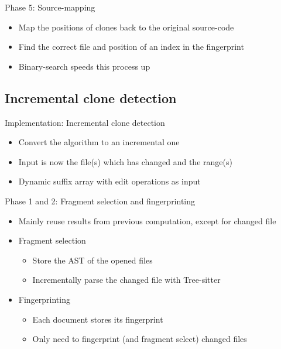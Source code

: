 \documentclass[aspectratio=1610, xcolor=table]{beamer}
\begin{document}
\begin{frame}{Phase 5: Source-mapping}
    \begin{itemize}
        \item Map the positions of clones back to the original source-code
        \item Find the correct file and position of an index in the fingerprint
        \item Binary-search speeds this process up
    \end{itemize}
\end{frame}


\subsection{Incremental clone detection}
\begin{frame}{Implementation: Incremental clone detection}
    \begin{itemize}
        \item Convert the algorithm to an incremental one
        \item Input is now the file(s) which has changed and the range(s)
        \item Dynamic suffix array with edit operations as input
    \end{itemize}
\end{frame}

\begin{frame}{Phase 1 and 2: Fragment selection and fingerprinting}
    \begin{itemize}
        \item Mainly reuse results from previous computation, except for changed file
        \item Fragment selection
    \begin{itemize}
        \item Store the AST of the opened files
        \item Incrementally parse the changed file with Tree-sitter
    \end{itemize}
\item Fingerprinting
    \begin{itemize}
        \item Each document stores its fingerprint
        \item Only need to fingerprint (and fragment select) changed files
    \end{itemize}
    \end{itemize}
\end{frame}
\end{document}
